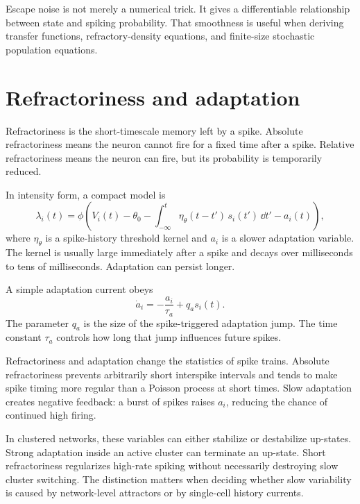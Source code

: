 Escape noise is not merely a numerical trick. It gives a differentiable relationship between state and spiking probability. That smoothness is useful when deriving transfer functions, refractory-density equations, and finite-size stochastic population equations.

\section{Refractoriness and adaptation}
\label{sec:refractoriness-adaptation}

Refractoriness is the short-timescale memory left by a spike. Absolute refractoriness means the neuron cannot fire for a fixed time after a spike. Relative refractoriness means the neuron can fire, but its probability is temporarily reduced.

In intensity form, a compact model is
%
\begin{equation}
  \lambda_i(t)
  =
  \phi\!\left(
    V_i(t)-\theta_0
    -\int_{-\infty}^{t} \eta_{\theta}(t-t')\,s_i(t')\,\dd t'
    -a_i(t)
  \right),
  \label{eq:refractory-intensity}
\end{equation}
%
where $\eta_{\theta}$ is a spike-history threshold kernel and $a_i$ is a slower adaptation variable. The kernel is usually large immediately after a spike and decays over milliseconds to tens of milliseconds. Adaptation can persist longer.

A simple adaptation current obeys
%
\begin{equation}
  \dot a_i
  =
  -\frac{a_i}{\tau_a}
  +
  q_a s_i(t).
  \label{eq:adaptation-current-project}
\end{equation}
%
The parameter $q_a$ is the size of the spike-triggered adaptation jump. The time constant $\tau_a$ controls how long that jump influences future spikes.

Refractoriness and adaptation change the statistics of spike trains. Absolute refractoriness prevents arbitrarily short interspike intervals and tends to make spike timing more regular than a Poisson process at short times. Slow adaptation creates negative feedback: a burst of spikes raises $a_i$, reducing the chance of continued high firing.

In clustered networks, these variables can either stabilize or destabilize up-states. Strong adaptation inside an active cluster can terminate an up-state. Short refractoriness regularizes high-rate spiking without necessarily destroying slow cluster switching. The distinction matters when deciding whether slow variability is caused by network-level attractors or by single-cell history currents.

